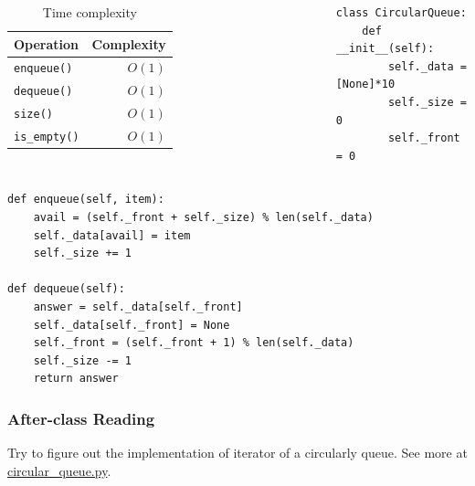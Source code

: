 \documentclass[aspectratio=169, 14pt]{beamer}
\begin{document}
\begin{frame}[fragile]
	\begin{columns}
		\begin{table}
			\caption{Time complexity}
			\begin{tabular}{lr}
				\toprule
				Operation            & Complexity \\
				\midrule
				\texttt{enqueue()}   & $O(1)$     \\
				\texttt{dequeue()}   & $O(1)$     \\
				\texttt{size()}      & $O(1)$     \\
				\texttt{is\_empty()} & $O(1)$     \\
				\bottomrule
			\end{tabular}
		\end{table}
		\begin{verbatim}
class CircularQueue:
    def __init__(self):
        self._data = [None]*10
        self._size = 0
        self._front = 0
        \end{verbatim}
	\end{columns}
\end{frame}

\begin{frame}[fragile]
	\begin{verbatim}
def enqueue(self, item):
    avail = (self._front + self._size) % len(self._data)
    self._data[avail] = item
    self._size += 1

def dequeue(self):
    answer = self._data[self._front]
    self._data[self._front] = None
    self._front = (self._front + 1) % len(self._data)
    self._size -= 1
    return answer
    \end{verbatim}
\end{frame}

\begin{frame}
	\frametitle{After-class Reading}
	Try to figure out the implementation of \alert{iterator} of a circularly queue. See more at \href{https://github.com/ChenZhongPu/data-structure-swufe/blob/master/code/python/stack-queue/circular\_queue.py}{circular\_queue.py}.
\end{frame}
\end{document}
